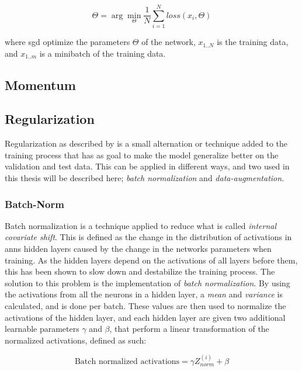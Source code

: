         \begin{equation} \label{batch_learning_eq}
            \Theta = \arg \min_{\Theta}\dfrac{1}{N} \sum^{N}_{i=1} loss (x_{i},\Theta)
        \end{equation}
    
    where \gls{sgd} optimize the parameters $\Theta$ of the network, $x_{1..N}$ is the training data, and $x_{1..m}$ is a minibatch of the training data.

\subsection{Momentum}


\subsection{Regularization}
    Regularization as described by \citeauthor{kukavcka2017_regularization}\cite{kukavcka2017_regularization} is a small alternation or technique added to the training process that has as goal to make the model generalize better on the validation and test data. This can be applied in different ways, and two used in this thesis will be described here; \textit{batch normalization} and \textit{data-augmentation}.
    
\subsubsection{Batch-Norm}
    Batch normalization is a technique applied to reduce what is called \textit{internal  covariate shift}\cite{pmlr-v37-ioffe15_batch_norm}. This is defined as the change in the distribution of activations in \gls{ann}s hidden layers caused by the change in the networks parameters when training. As the hidden layers depend on the activations of all layers before them, this has been shown to slow down and destabilize the training process. The solution to this problem is the implementation of \textit{batch normalization}. By using the activations from all the neurons in a hidden layer, a \textit{mean} and \textit{variance} is calculated, and is done per batch. These values are then used to normalize the activations of the hidden layer, and each hidden layer are given two additional learnable parameters $\gamma$ and $\beta$, that perform a linear transformation of the normalized activations, defined as such:
    
        \begin{equation} \label{batch_normalization}
            \textrm{Batch normalized activations} =   \gamma Z^{(i)}_{norm} + \beta
        \end{equation}
    
